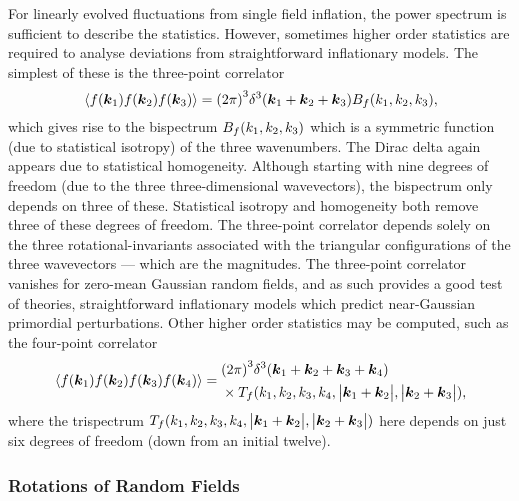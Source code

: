 For linearly evolved fluctuations from single field inflation, the power spectrum is sufficient to describe the statistics.
However, sometimes higher order statistics are required to analyse deviations from straightforward inflationary models.
The simplest of these is the three-point correlator
%
\begin{equation}
	\expval*{f(\vb*{k}_{1}) f(\vb*{k}_{2}) f(\vb*{k}_{3})}
	= {(2\pi)}^{3} \delta^{3}(\vb*{k}_{1} + \vb*{k}_{2} + \vb*{k}_{3}) B_{f}(k_{1},k_{2},k_{3}),
\end{equation}
%
which gives rise to the bispectrum \(B_{f}(k_{1},k_{2},k_{3})\) which is a symmetric function (due to statistical isotropy) of the three wavenumbers.
The Dirac delta again appears due to statistical homogeneity.
Although starting with nine degrees of freedom (due to the three three-dimensional wavevectors), the bispectrum only depends on three of these.
Statistical isotropy and homogeneity both remove three of these degrees of freedom.
The three-point correlator depends solely on the three rotational-invariants associated with the triangular configurations of the three wavevectors --- which are the magnitudes.
The three-point correlator vanishes for zero-mean Gaussian random fields, and as such provides a good test of theories, \ie{} straightforward inflationary models which predict near-Gaussian primordial perturbations.
Other higher order statistics may be computed, such as the four-point correlator
%
\begin{align}
	\expval*{f(\vb*{k}_{1}) f(\vb*{k}_{2}) f(\vb*{k}_{3}) f(\vb*{k}_{4})} =
	\begin{aligned}
		 & {(2\pi)}^{3} \delta^{3}(\vb*{k}_{1} + \vb*{k}_{2} + \vb*{k}_{3} + \vb*{k}_{4}) \\
		 & \times T_{f}(k_{1},k_{2},k_{3},k_{4},\big\lvert\vb*{k}_{1}+\vb*{k}_{2}\big\rvert,\big\lvert\vb*{k}_{2}+\vb*{k}_{3}\big\rvert),
	\end{aligned}
\end{align}
%
where the trispectrum \(T_{f}(k_{1},k_{2},k_{3},k_{4},\big\lvert\vb*{k}_{1}+\vb*{k}_{2}\big\rvert,\big\lvert\vb*{k}_{2}+\vb*{k}_{3}\big\rvert)\) here depends on just six degrees of freedom (down from an initial twelve).

\subsubsection{Rotations of Random Fields}

